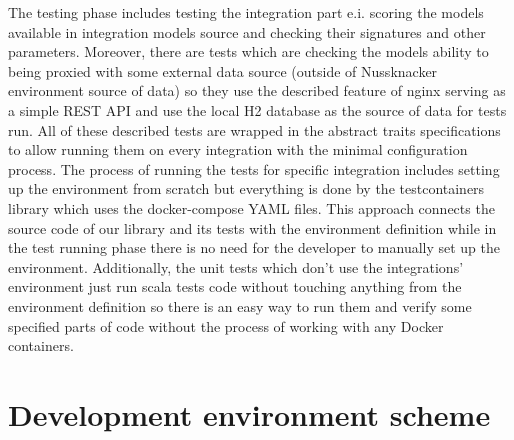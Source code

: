 The testing phase includes testing the integration part e.i. scoring the models available in integration
models source and checking their signatures and other parameters. Moreover, there are tests which are
checking the models ability to being proxied with some external data source (outside of Nussknacker
environment source of data) so they use the described feature of nginx serving as a simple REST API
and use the local H2 database as the source of data for tests run. All of these described tests are
wrapped in the abstract traits specifications to allow running them on every integration with the minimal
configuration process. The process of running the tests for specific integration includes setting up the
environment from scratch but everything is done by the testcontainers library which uses the docker-compose
YAML files. This approach connects the source code of our library and its tests with the environment
definition while in the test running phase there is no need for the developer to manually set up the
environment. Additionally, the unit tests which don’t use the integrations’ environment just run scala
tests code without touching anything from the environment definition so there is an easy way to run them
and verify some specified parts of code without the process of working with any Docker containers.

\section{Development environment scheme}


